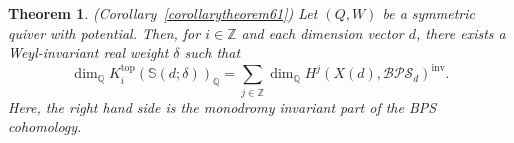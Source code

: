 \documentclass [11pt,oneside,a4paper,mathscr]{amsart}
\newtheorem{thm}{Theorem}[section]
\theoremstyle{definition}
\begin{document}
\begin{thm}\emph{(Corollary~\ref{corollarytheorem61})}
\label{t}
Let 
$(Q, W)$ be a symmetric quiver with potential. 
Then, for $i\in \mathbb{Z}$ and each dimension vector $d$, there exists a Weyl-invariant real weight $\delta$ 
such that 
\begin{equation}\label{ineqintro}
\dim_\mathbb{Q} K^{\mathrm{top}}_i(\mathbb{S}(d; \delta))_{\mathbb{Q}}= \sum_{j\in\mathbb{Z}} \dim_\mathbb{Q} H^j(X(d), \mathcal{BPS}_d)^{\mathrm{inv}}.
\end{equation}
Here, the right hand side is the monodromy invariant part of the BPS cohomology. 

\end{thm}



\end{document}
